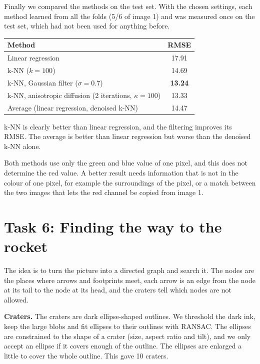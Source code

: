 \documentclass[11pt,a4paper]{article}
\begin{document}
Finally we compared the methods on the test set. With the chosen settings, each method learned from all the folds (5/6 of image 1) and was measured once on the test set, which had not been used for anything before.

\begin{center}
\begin{tabular}{lc}
\toprule
Method & RMSE \\
\midrule
Linear regression & 17.91 \\
k-NN ($k = 100$) & 14.69 \\
k-NN, Gaussian filter ($\sigma = 0.7$) & \textbf{13.24} \\
k-NN, anisotropic diffusion (2 iterations, $\kappa = 100$) & 13.33 \\
Average (linear regression, denoised k-NN) & 14.47 \\
\bottomrule
\end{tabular}
\end{center}

k-NN is clearly better than linear regression, and the filtering improves its RMSE. The average is better than linear regression but worse than the denoised k-NN alone. 

Both methods use only the green and blue value of one pixel, and this does not determine the red value. A better result needs information that is not in the colour of one pixel, for example the surroundings of the pixel, or a match between the two images that lets the red channel be copied from image 1.


\section{Task 6: Finding the way to the rocket}

The idea is to turn the picture into a directed graph and search it. The nodes are the places where arrows and footprints meet, each arrow is an edge from the node at its tail to the node at its head, and the craters tell which nodes are not allowed.

\textbf{Craters.} The craters are dark ellipse-shaped outlines. We threshold the dark ink, keep the large blobs and fit ellipses to their outlines with RANSAC. The ellipses are constrained to the shape of a crater (size, aspect ratio and tilt), and we only accept an ellipse if it covers enough of the outline. The ellipses are enlarged a little to cover the whole outline. This gave 10 craters.
\end{document}
